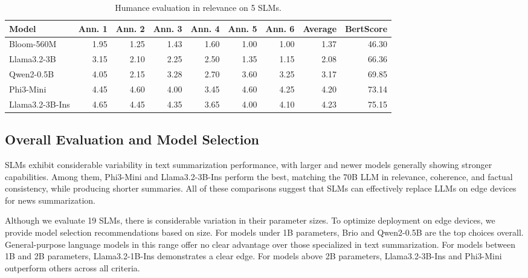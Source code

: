 \begin{table*}[]
\begin{tabular}{lrrrrrrrr}
\hline
Model & \multicolumn{1}{l}{Ann. 1} & \multicolumn{1}{l}{Ann. 2} & \multicolumn{1}{l}{Ann. 3} & \multicolumn{1}{l}{Ann. 4} & \multicolumn{1}{l}{Ann. 5} & \multicolumn{1}{l}{Ann. 6} & \multicolumn{1}{l}{Average} & \multicolumn{1}{l}{BertScore} \\ \hline
Bloom-560M & 1.95 & 1.25 & 1.43 & 1.60 & 1.00 & 1.00 & 1.37 & 46.30 \\
Llama3.2-3B & 3.15 & 2.10 & 2.25 & 2.50 & 1.35 & 1.15 & 2.08 & 66.36 \\
Qwen2-0.5B & 4.05 & 2.15 & 3.28 & 2.70 & 3.60 & 3.25 & 3.17 & 69.85 \\
Phi3-Mini & 4.45 & 4.60 & 4.00 & 3.45 & 4.60 & 4.25 & 4.20 & 73.14 \\
Llama3.2-3B-Ins & 4.65 & 4.45 & 4.35 & 3.65 & 4.00 & 4.10 & 4.23 & 75.15 \\ \hline
\end{tabular}
\caption{Humance evaluation in relevance on 5 SLMs.}
\label{tab:small_human_eva}
\end{table*}



\subsection{Overall Evaluation and Model Selection}
SLMs exhibit considerable variability in text summarization performance, with larger and newer models generally showing stronger capabilities. Among them, Phi3-Mini and Llama3.2-3B-Ins perform the best, matching the 70B LLM in relevance, coherence, and factual consistency, while producing shorter summaries. All of these comparisons suggest that SLMs can effectively replace LLMs on edge devices for news summarization.

Although we evaluate 19 SLMs, there is considerable variation in their parameter sizes. To optimize deployment on edge devices, we provide model selection recommendations based on size. For models under 1B parameters, Brio and Qwen2-0.5B are the top choices overall. General-purpose language models in this range offer no clear advantage over those specialized in text summarization. For models between 1B and 2B parameters, Llama3.2-1B-Ins demonstrates a clear edge. For models above 2B parameters, Llama3.2-3B-Ins and Phi3-Mini outperform others across all criteria.

